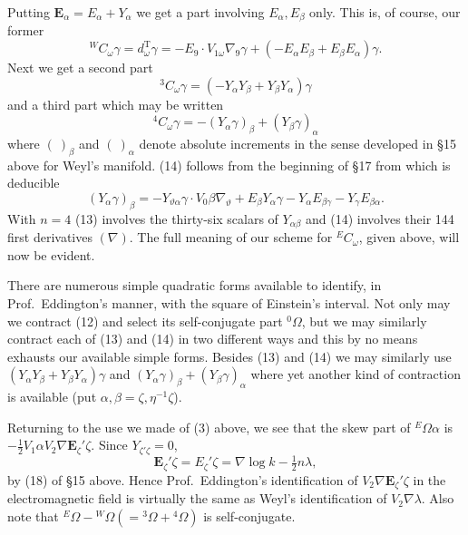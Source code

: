 \documentclass[11pt]{article}
\begin{document}
\indent Putting $\mathbf{E}_\alpha=E_\alpha+Y_\alpha$ we get a part involving $E_\alpha,E_\beta$ only. This is, of course, our former
\begin{equation}{}^W C_\omega\gamma=d_\omega^{\mathrm T}\gamma=-E_9\mathbin{\cdot}V_{1\omega}\nabla_9\gamma+(-E_\alpha E_\beta+E_\beta E_\alpha)\gamma.\tag{12}\end{equation}
\indent Next we get a second part
\begin{equation}{}^3C_\omega\gamma=(-Y_\alpha Y_\beta+Y_\beta Y_\alpha)\gamma\tag{13}\end{equation}
and a third part which may be written
\begin{equation}{}^4C_\omega\gamma=-(Y_\alpha\gamma)_\beta+(Y_\beta\gamma)_\alpha\tag{14}\end{equation}
where $(\ )_\beta$ and $(\ )_\alpha$ denote absolute increments in the sense developed in \S15 above for Weyl's manifold. (14) follows from the beginning of \S17 from which is deducible
\[
(Y_\alpha\gamma)_\beta=-Y_{\vartheta\alpha}\gamma\mathbin{\cdot}V_0\beta\nabla_\vartheta+E_\beta Y_\alpha\gamma-Y_\alpha E_{\beta\gamma}-Y_\gamma E_{\beta\alpha}.
\]
\indent With $n=4$ (13) involves the thirty-six scalars of $Y_{\alpha\beta}$ and (14) involves their 144 first derivatives $(\nabla)$. The full meaning of our scheme for ${}^E C_\omega$, given above, will now be evident.

\indent There are numerous simple quadratic forms available to identify, in Prof.\ Eddington's manner, with the square of Einstein's interval. Not only
may we contract (12) and select its self-conjugate part ${}^0\Omega$, but we may similarly contract each of (13) and (14) in two different ways and this by no means exhausts our available simple forms. Besides (13) and (14) we may similarly use $(Y_\alpha Y_\beta+Y_\beta Y_\alpha)\gamma$ and $(Y_\alpha\gamma)_\beta+(Y_\beta\gamma)_\alpha$ where yet another kind of contraction is available (put $\alpha,\beta=\zeta,\eta^{-1}\zeta$).

\indent Returning to the use we made of (3) above, we see that the skew part of ${}^E\Omega\alpha$ is $-\tfrac12V_1\alpha V_2\nabla\mathbf{E}_\zeta'\zeta$. Since $Y_{\zeta'\zeta}=0$,
\begin{equation}\mathbf{E}_\zeta'\zeta=E_\zeta'\zeta=\nabla\log k-\tfrac12n\lambda,\tag{15}\end{equation}
by (18) of \S15 above. Hence Prof.\ Eddington's identification of $V_2\nabla\mathbf{E}_\zeta'\zeta$ in the electromagnetic field is virtually the same as Weyl's identification of $V_2\nabla\lambda$. Also note that ${}^E\Omega-{}^W\Omega(={}^3\Omega+{}^4\Omega)$ is self-conjugate.
\end{document}
